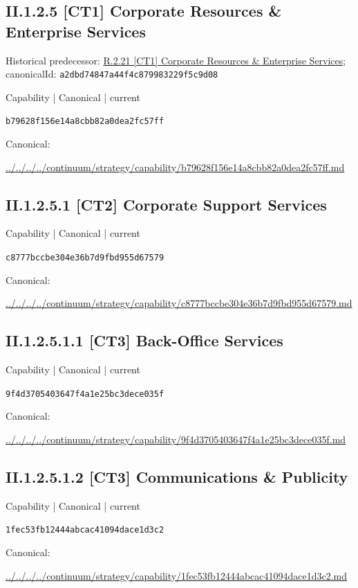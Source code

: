 \documentclass[10pt,a4paper]{article}
\begin{document}
\subsection*{II.1.2.5 [CT1] Corporate Resources \& Enterprise Services}
Historical predecessor: \hyperref[element-a2dbd74847a44f4c879983229f5c9d08]{R.2.21 [CT1] Corporate Resources \& Enterprise Services}; canonicalId: \texttt{a2dbd74847a44f4c879983229f5c9d08}\par
\label{element-b79628f156e14a8cbb82a0dea2fc57ff}
{\small Capability | Canonical | current}\par
\texttt{b79628f156e14a8cbb82a0dea2fc57ff}\par
Canonical: \par
{\footnotesize\url{../../../../continuum/strategy/capability/b79628f156e14a8cbb82a0dea2fc57ff.md}}\par
\subsection*{II.1.2.5.1 [CT2] Corporate Support Services}
\label{element-c8777bccbe304e36b7d9fbd955d67579}
{\small Capability | Canonical | current}\par
\texttt{c8777bccbe304e36b7d9fbd955d67579}\par
Canonical: \par
{\footnotesize\url{../../../../continuum/strategy/capability/c8777bccbe304e36b7d9fbd955d67579.md}}\par
\subsection*{II.1.2.5.1.1 [CT3] Back-Office Services}
\label{element-9f4d3705403647f4a1e25bc3dece035f}
{\small Capability | Canonical | current}\par
\texttt{9f4d3705403647f4a1e25bc3dece035f}\par
Canonical: \par
{\footnotesize\url{../../../../continuum/strategy/capability/9f4d3705403647f4a1e25bc3dece035f.md}}\par
\subsection*{II.1.2.5.1.2 [CT3] Communications \& Publicity}
\label{element-1fec53fb12444abcac41094dace1d3c2}
{\small Capability | Canonical | current}\par
\texttt{1fec53fb12444abcac41094dace1d3c2}\par
Canonical: \par
{\footnotesize\url{../../../../continuum/strategy/capability/1fec53fb12444abcac41094dace1d3c2.md}}\par
\end{document}
